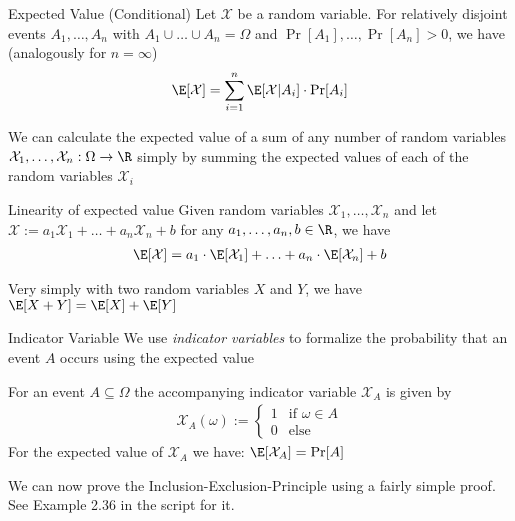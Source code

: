 \begin{theorem}[]{Expected Value (Conditional)}
    Let $\mathcal{X}$ be a random variable. For relatively disjoint events $A_1, \ldots, A_n$ with $A_1 \cup \ldots \cup A_n = \Omega$ and $\Pr[A_1], \ldots, \Pr[A_n] > 0$, we have (analogously for $n = \infty$)
    \begin{align*}
        \E[\mathcal{X}] = \sum_{i = 1}^{n} \E[\mathcal{X} | A_i] \cdot \Pr[A_i]
    \end{align*}
\end{theorem}


We can calculate the expected value of a sum of any number of random variables $\mathcal{X}_1, \ldots, \mathcal{X}_n : \Omega \rightarrow \R$ simply by summing the expected values of each of the random variables $\mathcal{X}_i$

\begin{theorem}[]{Linearity of expected value}
    Given random variables $\mathcal{X}_1, \ldots, \mathcal{X}_n$ and let $\mathcal{X} := a_1 \mathcal{X}_1 + \ldots + a_n \mathcal{X}_n + b$ for any $a_1, \ldots, a_n, b \in \R$, we have
    \begin{align*}
        \E[\mathcal{X}] = a_1 \cdot \E[\mathcal{X}_1] + \ldots + a_n \cdot \E[\mathcal{X}_n] + b
    \end{align*}
\end{theorem}

Very simply with two random variables $X$ and $Y$, we have $\E[X + Y] = \E[X] + \E[Y]$

\setcounter{all}{35}
\begin{definition}[]{Indicator Variable}
    We use \textit{indicator variables} to formalize the probability that an event $A$ occurs using the expected value

    For an event $A \subseteq \Omega$ the accompanying indicator variable $\mathcal{X}_A$ is given by
    \begin{align*}
        \mathcal{X}_A(\omega) := \begin{cases}
                                     1 & \text{if } \omega \in A \\
                                     0 & \text{else }
                                 \end{cases}
    \end{align*}
    For the expected value of $\mathcal{X}_A$ we have: $\E[\mathcal{X}_A] = \Pr[A]$
\end{definition}
We can now prove the Inclusion-Exclusion-Principle using a fairly simple proof. See Example 2.36 in the script for it.

